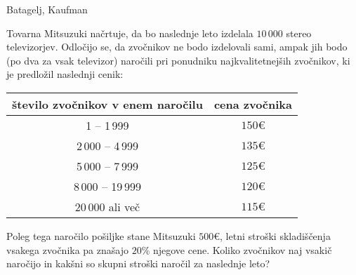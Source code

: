 \begin{naloga}{Batagelj, Kaufman}{\cite[Naloga~10.7]{bk}}
\begin{vprasanje}
Tovarna Mitsuzuki načrtuje,
da bo naslednje leto izdelala $10\,000$ stereo televizorjev.
Odločijo se, da zvočnikov ne bodo izdelovali sami,
ampak jih bodo (po dva za vsak televizor) naročili
pri ponudniku najkvalitetnejših zvočnikov,
ki je predložil naslednji cenik:
\begin{center}
\begin{tabular}{c|c}
število zvočnikov v enem naročilu & cena zvočnika \\
\hline
      1 --  1\,999 & $150 €$ \\
 2\,000 --  4\,999 & $135 €$ \\
 5\,000 --  7\,999 & $125 €$ \\
 8\,000 -- 19\,999 & $120 €$ \\
20\,000 ali več    & $115 €$ \\
\end{tabular}
\end{center}
Poleg tega naročilo pošiljke stane Mitsuzuki $500 €$,
letni stroški skladiščenja vsakega zvočnika pa znašajo $20\%$ njegove cene.
Koliko zvočnikov naj vsakič naročijo
in kakšni so skupni stroški naročil za naslednje leto?

\end{vprasanje}
\begin{odgovor}
\end{odgovor}
\end{naloga}
